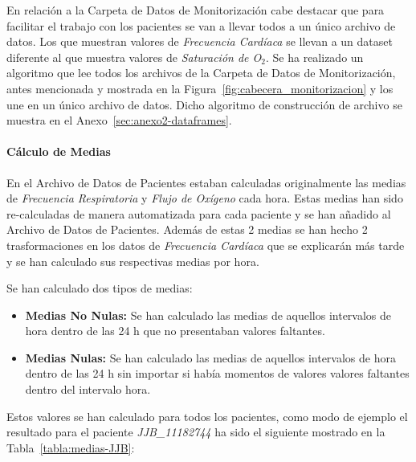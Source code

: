 En relación a la Carpeta de Datos de Monitorización cabe destacar que para facilitar el trabajo con los pacientes se van a llevar todos a un único archivo de datos. Los que muestran valores de \textit{Frecuencia Cardíaca} se llevan a un dataset diferente al que muestra valores de \textit{Saturación de O$_2$}. Se ha realizado un algoritmo que lee todos los archivos de la Carpeta de Datos de Monitorización, antes mencionada y mostrada en la Figura~\ref{fig:cabecera_monitorizacion} y los une en un único archivo de datos. Dicho algoritmo de construcción de archivo se muestra en el Anexo~\ref{sec:anexo2-dataframes}.

\paragraph{Cálculo de Medias}

En el Archivo de Datos de Pacientes estaban calculadas originalmente las medias de \textit{Frecuencia Respiratoria} y \textit{Flujo de Oxígeno} cada hora. Estas medias han sido re-calculadas de manera automatizada para cada paciente y se han añadido al Archivo de Datos de Pacientes. Además de estas 2 medias se han hecho 2 trasformaciones en los datos de \textit{Frecuencia Cardíaca} que se explicarán más tarde y se han calculado sus respectivas medias por hora. 

Se han calculado dos tipos de medias: 

\begin{itemize}
    \item \textbf{Medias No Nulas:} Se han calculado las medias de aquellos intervalos de hora dentro de las 24 h que no presentaban valores faltantes.
    \item \textbf{Medias Nulas:} Se han calculado las medias de aquellos intervalos de hora dentro de las 24 h sin importar si había momentos de valores valores faltantes dentro del intervalo hora.
\end{itemize}

Estos valores se han calculado para todos los pacientes, como modo de ejemplo el resultado para el paciente \textit{JJB\_11182744} ha sido el siguiente mostrado en la Tabla~\ref{tabla:medias-JJB}:

\newpage
\thispagestyle{empty}

